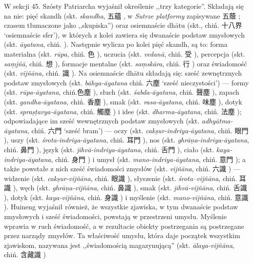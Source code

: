 W sekcji 45. Szósty Patriarcha wyjaśnił określenie ,,trzy kategorie''.
Składają się na nie: pięć skandh (skt. \textit{skandha}, 五蘊 , w \textit{Sutrze platformy} zapisywane 五蔭 ; czasem tłumaczone jako ,,skupiska'') oraz osiemnaście dhātu (skt., chiń. 十八界  `osiemnaście sfer'), w których z kolei zawiera się dwanaście podstaw zmysłowych (skt. \nohyphens{\itshape āyatana}, chiń. ).
Następnie wylicza po kolei pięć skandh, są to: forma materialna (skt. \textit{rūpa}, chiń. 色 ), uczucia (skt. \textit{vedanā}, chiń. 受 ), percepcja (skt. \textit{sa\d{m}jñā}, chiń. 想 ), formacje mentalne (skt. \textit{sa\d{m}skāra}, chiń. 行 ) oraz świadomość (skt. \textit{vijñāna}, chiń. 識 ).
Na osiemnaście dhātu składają się: sześć zewnętrznych podstaw zmysłowych (skt. \textit{bāhya-āyatana} chiń. 六塵 `sześć nieczystości') %
--- formy (skt. \textit{rūpa-āyatana}, chiń.色塵 ), słuch (skt. \textit{śabda-āyatana}, chiń. 聲塵 ), zapach (skt. \textit{gandha-āyatana}, chiń. 香塵 ), smak (skt. \textit{rasa-āyatana}, chiń. 味塵 ), dotyk (skt. \textit{spra\d{s}\d{t}avya-āyatana}, chiń. 觸塵 ) i idee (skt. \textit{dharma-āyatana}, chiń. 法塵 );
odpowiadające im sześć wewnętrznych podstaw zmysłowych (skt. \textit{adhyātma-āyatana}, chiń. 六門  `sześć bram') --- oczy (skt. \textit{cak\d{s}ur-indriya-āyatana}, chiń. 眼門 ), uszy (skt. \textit{śrota-indriya-āyatana}, chiń. 耳門 ), nos (skt. \textit{ghrā\d{n}a-indriya-āyatana}, chiń. 鼻門 ), język (skt. \textit{jihvā-indriya-āyatana}, chiń. 舌門 ), ciało (skt. \textit{kaya-indriya-āyatana}, chiń. 身門 ) i umysł (skt. \textit{mano-indriya-āyatana}, chiń. 意門 );
a także powstałe z nich sześć świadomości zmysłów (skt. \textit{vijñāna}, chiń. 六識 ) --- widzenie (skt. \textit{cak\d{s}ur-vijñāna}, chiń. 眼識 ), słyszenie (skt. \textit{śrota--vijñāna}, chiń. 耳識 ), węch (skt. \textit{ghrā\d{n}a-vijñāna}, chiń. 鼻識 ), smak (skt. \textit{jihvā-vijñāna}, chiń. 舌識 ), dotyk (skt. \textit{kaya-vijñāna}, chiń. 身識 ) i myślenie (skt. \textit{mano-vijñāna}, chiń. 意識 ).
Huineng wyjaśnił również, że wszystkie zjawiska, w tym dwanaście podstaw zmysłowych i sześć świadomości, powstają w przestrzeni umysłu.
Myślenie wprawia w ruch świadomość, a w rezultacie obiekty postrzegania są postrzegane przez narządy zmysłów.
Ta właściwość umysłu, która daje początek wszystkim zjawiskom, nazywana jest ,,świadomością magazynującą'' (skt. \textit{ālaya-vijñāna}, chiń. 含藏識 )\ibid


